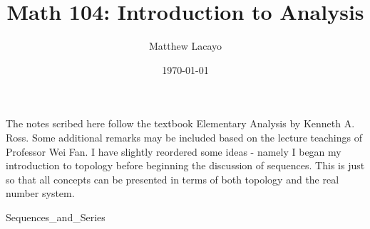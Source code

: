 \documentclass[11pt, oneside]{article}   	%
\theoremstyle{definition}
\begin{document}
\title{Math 104: Introduction to Analysis}
\author{Matthew Lacayo}
\date{\today}
\maketitle

The notes scribed here follow the textbook Elementary Analysis by Kenneth A. Ross. Some additional remarks may be included based on the lecture teachings of Professor Wei Fan. I have slightly reordered some ideas - namely I began my introduction to topology before beginning the discussion of sequences. This is just so that all concepts can be presented in terms of both topology and the real number system.

\newpage

\tableofcontents


\newpage


\newpage


\newpage
 {Sequences_and_Series}

\newpage


\newpage

\end{document}
